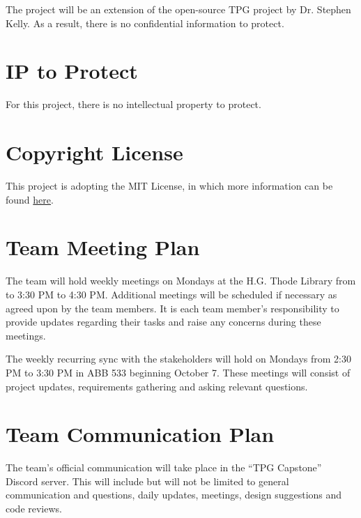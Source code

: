 \documentclass{article}
\begin{document}

The project will be an extension of the open-source TPG project by Dr. Stephen Kelly. As a result, there is no confidential information to protect.
\section{IP to Protect}

For this project, there is no intellectual property to protect.

\section{Copyright License}
This project is adopting the MIT License, in which more information can be found \href{https://github.com/TPGEngine/tpg/blob/main/LICENSE}{here}.

\section{Team Meeting Plan}
The team will hold weekly meetings on Mondays at the H.G. Thode Library from to 3:30 PM to 4:30 PM. Additional meetings will be scheduled if necessary as agreed upon by the team members. It is each team member’s responsibility to provide updates regarding their tasks and raise any concerns during these meetings. 

\vspace*{10pt}

\noindent The weekly recurring sync with the stakeholders will hold on Mondays from 2:30 PM to 3:30 PM in ABB 533 beginning October 7. These meetings will consist of project updates, requirements gathering and asking relevant questions.

\section{Team Communication Plan}
The team’s official communication will take place in the “TPG Capstone” Discord server. This will include but will not be limited to general communication and questions, daily updates, meetings, design suggestions and code reviews.
\end{document}
